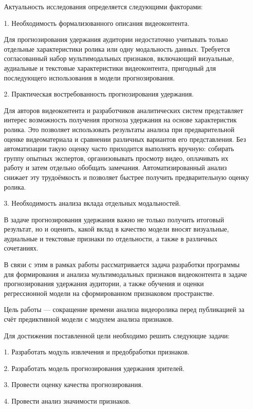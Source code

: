 \documentclass[times]{itmo-student-thesis}
\begin{document}
Актуальность исследования определяется следующими факторами:

1. Необходимость формализованного описания видеоконтента.

Для прогнозирования удержания аудитории недостаточно учитывать только отдельные характеристики ролика или одну модальность данных. Требуется согласованный набор мультимодальных признаков, включающий визуальные, аудиальные и текстовые характеристики видеоконтента, пригодный для последующего использования в модели прогнозирования.

2. Практическая востребованность прогнозирования удержания.

Для авторов видеоконтента и разработчиков аналитических систем представляет интерес возможность получения прогноза удержания на основе характеристик ролика. Это позволяет использовать результаты анализа при предварительной оценке видеоматериала и сравнении различных вариантов его представления. Без автоматизации такую оценку часто приходится выполнять вручную: собирать группу опытных экспертов, организовывать просмотр видео, оплачивать их работу и затем отдельно обобщать замечания. Автоматизированный анализ снижает эту трудоёмкость и позволяет быстрее получить предварительную оценку ролика.

3. Необходимость анализа вклада отдельных модальностей.

В задаче прогнозирования удержания важно не только получить итоговый результат, но и оценить, какой вклад в качество модели вносят визуальные, аудиальные и текстовые признаки по отдельности, а также в различных сочетаниях.

В связи с этим в рамках работы рассматривается задача разработки программы для формирования и анализа мультимодальных признаков видеоконтента в задаче прогнозирования удержания аудитории, а также обучения и оценки регрессионной модели на сформированном признаковом пространстве.

Цель работы — сокращение времени анализа видеоролика перед публикацией за счёт предиктивной модели с модулем анализа признаков.

Для достижения поставленной цели необходимо решить следующие задачи:

1. Разработать модуль извлечения и предобработки признаков.

2. Разработать модель прогнозирования удержания зрителей.

3. Провести оценку качества прогнозирования.

4. Провести анализ значимости признаков.
\end{document}
